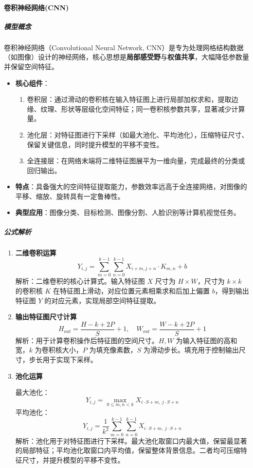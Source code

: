 \documentclass[12pt]{article}
\begin{document}
\paragraph{卷积神经网络(CNN)}
\subparagraph{模型概念}
卷积神经网络（Convolutional Neural Network, CNN）是专为处理网格结构数据（如图像）设计的神经网络，核心思想是\textbf{局部感受野}与\textbf{权值共享}，大幅降低参数量并保留空间特征。
\begin{itemize}
    \item \textbf{核心组件}：
    \begin{enumerate}
        \item 卷积层：通过滑动的卷积核在输入特征图上进行局部加权求和，提取边缘、纹理、形状等层级化空间特征；同一卷积核参数共享，显著减少计算量。
        \item 池化层：对特征图进行下采样（如最大池化、平均池化），压缩特征尺寸、保留关键信息，同时提升模型的平移不变性。
        \item 全连接层：在网络末端将二维特征图展平为一维向量，完成最终的分类或回归输出。
    \end{enumerate}
    \item \textbf{特点}：具备强大的空间特征提取能力，参数效率远高于全连接网络，对图像的平移、缩放、旋转具有一定鲁棒性。
    \item \textbf{典型应用}：图像分类、目标检测、图像分割、人脸识别等计算机视觉任务。
\end{itemize}

\subparagraph{公式解析}
\begin{enumerate}
    \item \textbf{二维卷积运算}
    \[
    Y_{i,j} = \sum_{m=0}^{k-1} \sum_{n=0}^{k-1} X_{i+m, j+n} \cdot K_{m,n} + b
    \]
    解析：二维卷积的核心计算式。输入特征图 $X$ 尺寸为 $H\times W$，尺寸为 $k\times k$ 的卷积核 $K$ 在特征图上滑动，对应位置元素相乘求和后加上偏置 $b$，得到输出特征图 $Y$ 的对应元素，实现局部空间特征提取。

    \item \textbf{输出特征图尺寸计算}
    \[
    H_{out} = \frac{H - k + 2P}{S} + 1,\quad W_{out} = \frac{W - k + 2P}{S} + 1
    \]
    解析：用于计算卷积操作后特征图的空间尺寸。$H,W$ 为输入特征图的高和宽，$k$ 为卷积核大小，$P$ 为填充像素数，$S$ 为滑动步长。填充用于控制输出尺寸，步长用于实现下采样。

    \item \textbf{池化运算}
    
    最大池化：
    \[
    Y_{i,j} = \max_{0\leq m,n < k} X_{i\cdot S + m,\ j\cdot S + n}
    \]
    平均池化：
    \[
    Y_{i,j} = \frac{1}{k^2} \sum_{m=0}^{k-1} \sum_{n=0}^{k-1} X_{i\cdot S + m,\ j\cdot S + n}
    \]
    解析：池化用于对特征图进行下采样。最大池化取窗口内最大值，保留最显著的局部特征；平均池化取窗口内平均值，保留整体背景信息。二者均可压缩特征尺寸，并提升模型的平移不变性。
\end{enumerate}
\end{document}
